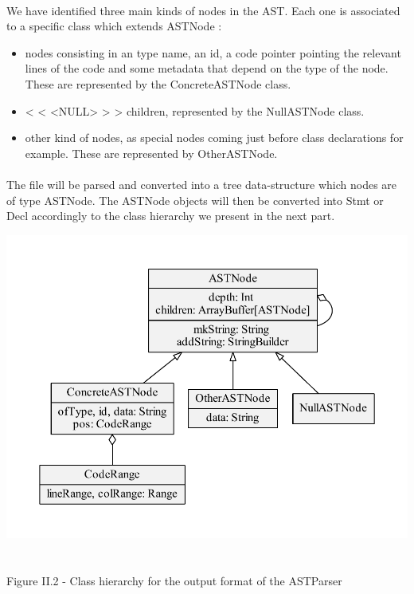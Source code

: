 \documentclass{report}
\begin{document}
\paragraph{}
\hspace{4mm}We have identified three main kinds of nodes in the AST. Each one is associated to a specific class which extends ASTNode :

\vspace{1.5mm}
\begin{itemize}
\item nodes consisting in an type name, an id, a code pointer pointing the relevant lines of the code and some
metadata that depend on the type of the node. These are represented by the ConcreteASTNode class.\vspace{1mm}
\item < < <NULL> > > children, represented by the NullASTNode class.\vspace{1mm}
\item other kind of nodes, as special nodes coming just before class declarations for example. These are represented by OtherASTNode.\vspace{1mm}
\end{itemize}

\paragraph{}
\hspace{4mm}The file will be parsed and converted into a tree data-structure which nodes are of type ASTNode. The ASTNode objects
will then be converted into Stmt or Decl accordingly to the class hierarchy we present in the next part.

\begin{center}
\includegraphics[scale=0.6]{data/AST_classes}
~\\~\\Figure II.2 - Class hierarchy for the output format of the ASTParser
\end{center}
\end{document}
